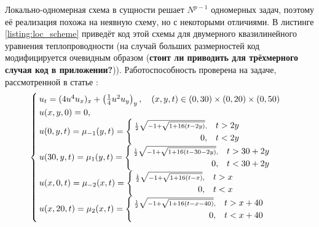 Локально-одномерная схема в сущности решает $N^{p - 1}$ одномерных задач, поэтому её реализация похожа на неявную схему, но с некоторыми отличиями.
В листинге \ref{listing:loc_scheme} приведёт код этой схемы для двумерного квазилинейного уравнения теплопроводности (на случай больших размерностей код модифицируется очевидным образом (\textbf{стоит ли приводить для трёхмерного случая код в приложении?})).
Работоспособность проверена на задаче, рассмотренной в статье \cite{самарский1963примеры}:
\begin{equation}\label{eq:problem_3}
    \textstyle
    \begin{cases}
        u_t = (4u^4 u_x)_x + \left( \frac{1}{4} u^2 u_y \right)_y, \quad (x, y, t) \in (0, 30) \times (0, 20) \times (0, 50)\\
        u(x, y, 0) = 0,\\
        u(0, y, t) = \mu_{-1}(y, t) = \begin{cases}
            \scriptstyle\frac{1}{2}\sqrt{-1 + \sqrt{1 + 16(t - 2y)}}, & t > 2y\\
            \hfill 0, & t < 2y
        \end{cases}\\
        u(30, y, t) = \mu_1(y, t) = \begin{cases}
            \scriptstyle\frac{1}{2}\sqrt{-1 + \sqrt{1 + 16(t - 30 - 2y)}}, & t > 30 + 2y\\
            \hfill 0, & t < 30 + 2y
        \end{cases}\\
        u(x, 0, t) = \mu_{-2}(x, t) = \begin{cases}
            \scriptstyle\frac{1}{2}\sqrt{-1 + \sqrt{1 + 16(t - x)}}, & t > x\\
            \hfill 0, & t < x
        \end{cases}\\
        u(x, 20, t) = \mu_2(x, t) = \begin{cases}
            \scriptstyle\frac{1}{2}\sqrt{-1 + \sqrt{1 + 16(t - x - 40)}}, & t > x + 40\\
            \hfill 0, & t < x + 40
        \end{cases}
    \end{cases}
\end{equation}
